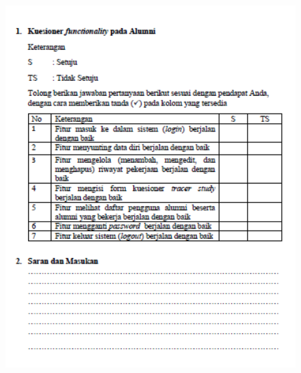 \begin{figure}[H]
	\centering
	\includegraphics[width=15cm,height=18cm]{gambar/UAT/kf_alumni}
	\label{kf_alumni}
\end{figure}

